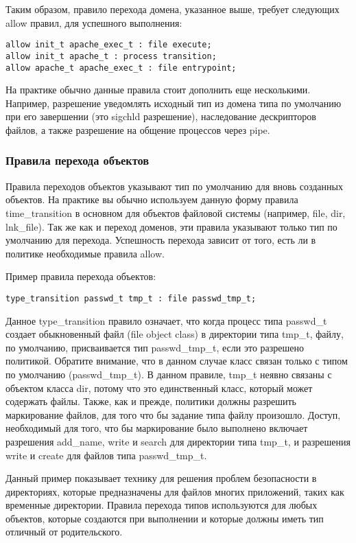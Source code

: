 \documentclass{./../class/UIR}
\begin{document}
    Таким образом, правило перехода домена, указанное выше, требует следующих
    allow правил, для успешного выполнения:
\begin{verbatim}
allow init_t apache_exec_t : file execute;
allow init_t apache_t : process transition;
allow apache_t apache_exec_t : file entrypoint;
\end{verbatim}
    На практике обычно данные правила стоит дополнить еще несколькими. Например,
    разрешение уведомлять исходный тип из домена типа по умолчанию при его
    завершении (это sigchld разрешение), наследование дескрипторов файлов, а
    также разрешение на общение процессов через pipe.

\subsubsection{Правила перехода объектов}

    Правила переходов объектов указывают тип по умолчанию для вновь созданных
    объектов. На практике вы обычно используем данную форму правила
    time\_transition в основном для объектов файловой системы (например, file,
    dir, lnk\_file). Так же как и переход доменов, эти правила указывают только
    тип по умолчанию для перехода. Успешность перехода зависит от того, есть ли
    в политике необходимые правила allow.

    Пример правила перехода объектов:
\begin{verbatim}
type_transition passwd_t tmp_t : file passwd_tmp_t;
\end{verbatim}
    Данное type\_transition правило означает, что когда процесс типа passwd\_t
    создает обыкновенный файл (file object class) в директории типа tmp\_t,
    файлу, по умолчанию, присваивается тип passwd\_tmp\_t, если это разрешено
    политикой. Обратите внимание, что в данном случае класс связан только с
    типом по умолчанию (passwd\_tmp\_t). В данном правиле, tmp\_t неявно
    связаны с объектом класса dir, потому что это единственный класс, который
    может содержать файлы. Также, как и прежде, политики должны разрешить
    маркирование файлов, для того что бы задание типа файлу произошло. Доступ,
    необходимый для того, что бы маркирование было выполнено включает
    разрешения add\_name, write и search для директории типа tmp\_t, и
    разрешения write и create для файлов типа passwd\_tmp\_t.

    Данный пример показывает технику для решения проблем безопасности в
    директориях, которые предназначены для файлов многих приложений, таких как
    временные директории. Правила перехода типов используются для любых
    объектов, которые создаются при выполнении и которые должны иметь тип
    отличный от родительского.
\end{document}
